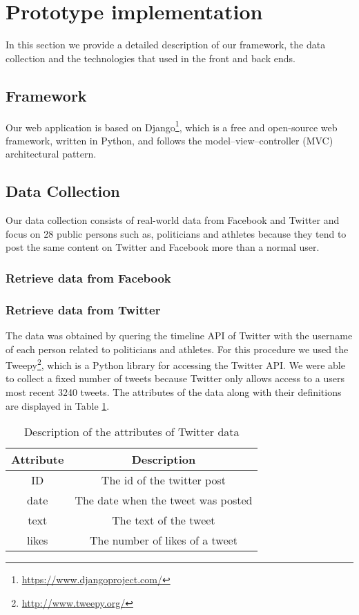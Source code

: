 \section{Prototype implementation}

In this section we provide a detailed description of our framework, the data collection and the technologies that used in the front and back ends.


\subsection{Framework}

Our web application is based on Django\footnote{\url{https://www.djangoproject.com/}}, which is a free and open-source web framework, written in Python, and follows the model–view–controller (MVC) architectural pattern.

\subsection{Data Collection}

Our data collection consists of real-world data from Facebook 
and Twitter and focus on 28 public persons such as, politicians 
and athletes because they tend to post the same content on Twitter and Facebook more than a normal user.

\subsubsection{Retrieve data from Facebook}
 

\subsubsection{Retrieve data from Twitter}

The data was obtained by quering the timeline API of Twitter with the username of each person related to politicians and athletes. For this procedure we used the Tweepy\footnote{\url{http://www.tweepy.org/}}, which is a Python library for accessing the Twitter API. We were able to collect a fixed number of tweets because Twitter only allows access to a users most recent 3240 tweets. The attributes of the data along with their definitions
are displayed in Table \ref{table:attrib_des}.

\begin{table}[ht] 
\caption{Description of the attributes of Twitter data} 
\centering  
\begin{tabular}{c | c} 
\hline\hline 
Attribute & Description \\ [0.5ex] 
\hline 
ID & The id of the twitter post \\ 
date & The date when the tweet was posted \\ 
text & The text of the tweet\\ 
likes & The number of likes of a tweet \\ [1ex]  
\hline  
\end{tabular} 
\label{table:attrib_des}
\end{table} 

